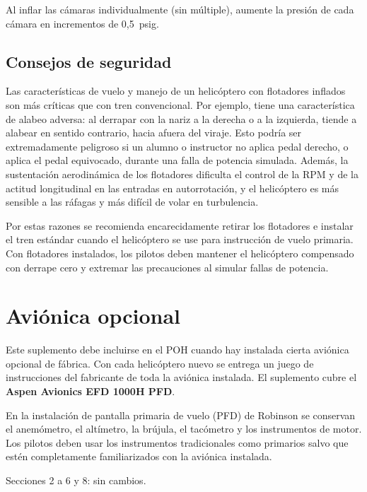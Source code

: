 \begin{precaucion}
Al inflar las cámaras individualmente (sin múltiple), aumente la presión de cada cámara en incrementos de 0,5~psig.
\end{precaucion}

\subsection{Consejos de seguridad}

Las características de vuelo y manejo de un helicóptero con flotadores inflados son más críticas que con tren convencional. Por ejemplo, tiene una característica de alabeo adversa: al derrapar con la nariz a la derecha o a la izquierda, tiende a alabear en sentido contrario, hacia afuera del viraje. Esto podría ser extremadamente peligroso si un alumno o instructor no aplica pedal derecho, o aplica el pedal equivocado, durante una falla de potencia simulada. Además, la sustentación aerodinámica de los flotadores dificulta el control de la RPM y de la actitud longitudinal en las entradas en autorrotación, y el helicóptero es más sensible a las ráfagas y más difícil de volar en turbulencia.

Por estas razones se recomienda encarecidamente retirar los flotadores e instalar el tren estándar cuando el helicóptero se use para instrucción de vuelo primaria. Con flotadores instalados, los pilotos deben mantener el helicóptero compensado con derrape cero y extremar las precauciones al simular fallas de potencia.

\section{Aviónica opcional}

Este suplemento debe incluirse en el POH cuando hay instalada cierta aviónica opcional de fábrica. Con cada helicóptero nuevo se entrega un juego de instrucciones del fabricante de toda la aviónica instalada. El suplemento cubre el \textbf{Aspen Avionics EFD 1000H PFD}.

\begin{nota}
En la instalación de pantalla primaria de vuelo (PFD) de Robinson se conservan el anemómetro, el altímetro, la brújula, el tacómetro y los instrumentos de motor. Los pilotos deben usar los instrumentos tradicionales como primarios salvo que estén completamente familiarizados con la aviónica instalada.
\end{nota}

Secciones 2 a 6 y 8: sin cambios.

